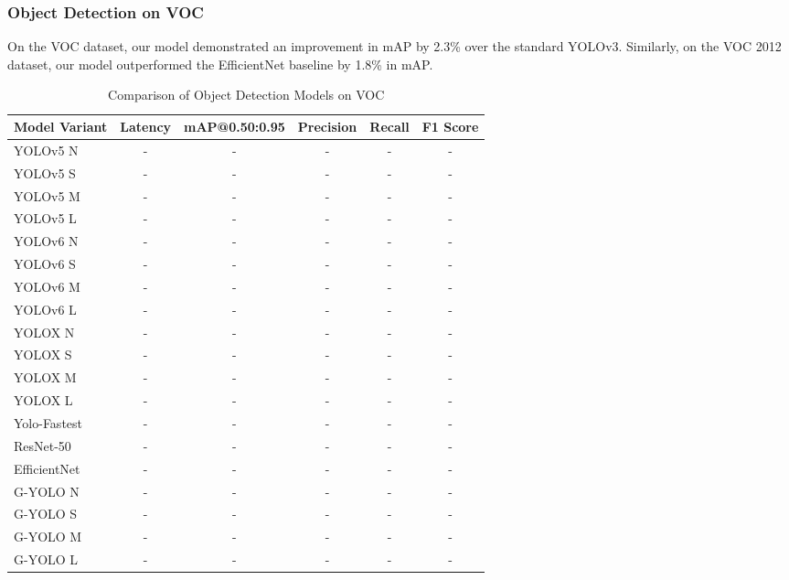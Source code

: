 \subsubsection{Object Detection on VOC}

On the VOC dataset, our model demonstrated an improvement in mAP by 2.3\% over the standard YOLOv3. Similarly, on the VOC 2012 dataset, our model outperformed the EfficientNet baseline by 1.8\% in mAP.

\begin{table}[htbp]
    \centering
    \caption{Comparison of Object Detection Models on VOC}
    \label{tab:voc_model_comparison}
    \begin{tabularx}{\textwidth}{@{}Xccccc@{}}
    \toprule
    Model Variant & Latency & mAP@0.50:0.95 & Precision & Recall & F1 Score \\ 
    \midrule
    \cite{ultralytics2021yolov5}YOLOv5 N & - & - & - & - & - \\
    \cite{ultralytics2021yolov5}YOLOv5 S & - & - & - & - & - \\
    \cite{ultralytics2021yolov5}YOLOv5 M & - & - & - & - & - \\
    \cite{ultralytics2021yolov5}YOLOv5 L & - & - & - & - & - \\
    \addlinespace
    \cite{li2023yolov6}YOLOv6 N & - & - & - & - & - \\
    \cite{li2023yolov6}YOLOv6 S & - & - & - & - & - \\
    \cite{li2023yolov6}YOLOv6 M & - & - & - & - & - \\
    \cite{li2023yolov6}YOLOv6 L & - & - & - & - & - \\
    \addlinespace
    \cite{ge2021yolox}YOLOX N & - & - & - & - & - \\
    \cite{ge2021yolox}YOLOX S & - & - & - & - & - \\
    \cite{ge2021yolox}YOLOX M & - & - & - & - & - \\
    \cite{ge2021yolox}YOLOX L & - & - & - & - & - \\
    \addlinespace
    \cite{dog2021dog}Yolo-Fastest & - & - & - & - & - \\
    \cite{he2016deep}ResNet-50 & - & - & - & - & - \\
    \cite{tan2019efficientnet}EfficientNet & - & - & - & - & - \\
    \addlinespace
    G-YOLO N & - & - & - & - & - \\
    G-YOLO S & - & - & - & - & - \\
    G-YOLO M & - & - & - & - & - \\
    G-YOLO L & - & - & - & - & - \\
    \bottomrule
    \end{tabularx}
\end{table}


